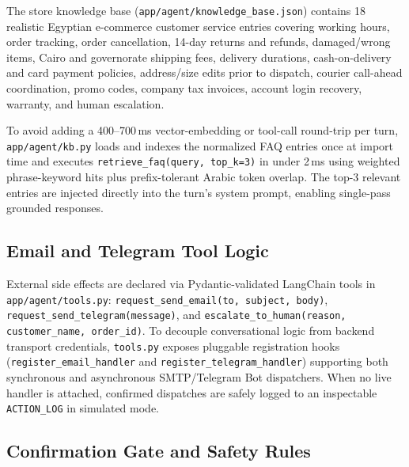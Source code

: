 The store knowledge base (\texttt{app/agent/knowledge\_base.json}) contains 18 realistic Egyptian e-commerce customer service entries covering working hours, order tracking, order cancellation, 14-day returns and refunds, damaged/wrong items, Cairo and governorate shipping fees, delivery durations, cash-on-delivery and card payment policies, address/size edits prior to dispatch, courier call-ahead coordination, promo codes, company tax invoices, account login recovery, warranty, and human escalation.

To avoid adding a 400--700\,ms vector-embedding or tool-call round-trip per turn, \texttt{app/agent/kb.py} loads and indexes the normalized FAQ entries once at import time and executes \texttt{retrieve\_faq(query, top\_k=3)} in under 2\,ms using weighted phrase-keyword hits plus prefix-tolerant Arabic token overlap. The top-3 relevant entries are injected directly into the turn's system prompt, enabling single-pass grounded responses.

\subsection{Email and Telegram Tool Logic}
\label{subsec:tool_logic}

External side effects are declared via Pydantic-validated LangChain tools in \texttt{app/agent/tools.py}: \texttt{request\_send\_email(to, subject, body)}, \texttt{request\_send\_telegram(message)}, and \texttt{escalate\_to\_human(reason, customer\_name, order\_id)}. To decouple conversational logic from backend transport credentials, \texttt{tools.py} exposes pluggable registration hooks (\texttt{register\_email\_handler} and \texttt{register\_telegram\_handler}) supporting both synchronous and asynchronous SMTP/Telegram Bot dispatchers. When no live handler is attached, confirmed dispatches are safely logged to an inspectable \texttt{ACTION\_LOG} in simulated mode.

\subsection{Confirmation Gate and Safety Rules}
\label{subsec:confirmation_safety}

